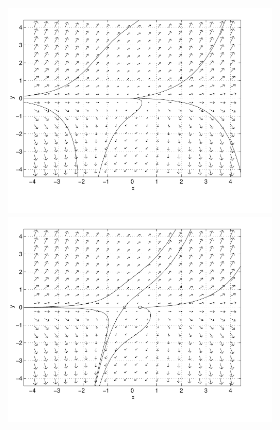\documentclass{ximera}
\begin{document}
\begin{computerExercise}
\begin{solution}
\begin{figure}[htb]
                       \centerline{%
                       \includegraphics[width=2.75in]{exfigure/sourcea.pdf}
                       \includegraphics[width=2.75in]{exfigure/sourceb.pdf}}
\end{figure}

\end{solution}
\end{computerExercise}
\end{document}

